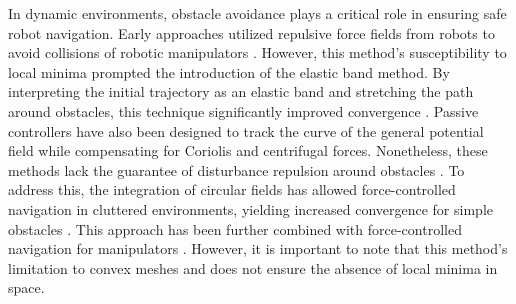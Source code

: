 In dynamic environments, obstacle avoidance plays a critical role in ensuring safe robot navigation. Early approaches utilized repulsive force fields from robots to avoid collisions of robotic manipulators \cite{khatib1987unified}. However, this method's susceptibility to local minima prompted the introduction of the elastic band method. By interpreting the initial trajectory as an elastic band and stretching the path around obstacles, this technique significantly improved convergence \cite{brock2002elastic}.
Passive controllers have also been designed to track the curve of the general potential field while compensating for Coriolis and centrifugal forces. Nonetheless, these methods lack the guarantee of disturbance repulsion around obstacles \cite{duindam2004passive}. To address this, the integration of circular fields \cite{singh1996real} has allowed force-controlled navigation in cluttered environments, yielding increased convergence for simple obstacles \cite{haddadin2011dynamic}. This approach has been further combined with force-controlled navigation for manipulators \cite{tulbure2020closing}. 
However, it is important to note that this method's limitation to convex meshes and does not ensure the absence of local minima in space.


